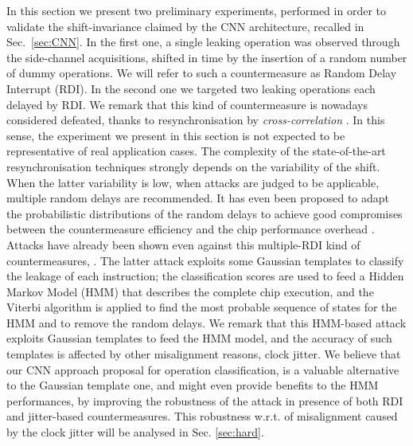 In this section we present two preliminary  experiments, performed in order to validate the shift-invariance claimed by the CNN architecture, recalled in Sec.~\ref{sec:CNN}. In the first one, a single leaking operation was observed through the side-channel acquisitions, shifted in time by the insertion of a random number of dummy operations. We will refer to such a countermeasure as Random Delay Interrupt (RDI).  In the second one we targeted two leaking operations each delayed by RDI. We remark that this kind of countermeasure is nowadays considered defeated, \eg thanks to resynchronisation by \emph{cross-correlation} \cite{nagashima2007dpa}. In this sense, the experiment we present in this section is not expected to be representative of real application cases. The complexity of the state-of-the-art resynchronisation techniques strongly depends on the variability of the shift. When the latter variability is low, \ie when attacks are judged to be applicable, multiple random delays are recommended. It has even been proposed to adapt the probabilistic distributions of the random delays to achieve good compromises between the countermeasure efficiency and the chip performance overhead \cite{coron2009efficient,coron2010analysis}. Attacks have already been shown even against this multiple-RDI kind of countermeasures, \eg \cite{durvaux2012efficient}. The latter attack exploits some Gaussian templates to classify the leakage of each instruction; the classification scores are used to feed a Hidden Markov Model (HMM) that describes the complete chip execution, and the Viterbi algorithm is applied to find the most probable sequence of states for the HMM and to remove the random delays. We remark that this HMM-based attack exploits Gaussian templates to feed the HMM model, and the accuracy of such templates is affected by other misalignment reasons, \eg clock jitter. We believe that our  CNN approach proposal for operation classification, is a valuable alternative to  the Gaussian template one, and might even provide benefits to the HMM performances, by \eg improving the robustness of the attack in presence of both RDI and jitter-based countermeasures. This robustness w.r.t. of misalignment caused by the clock jitter will be analysed in Sec. \ref{sec:hard}.

